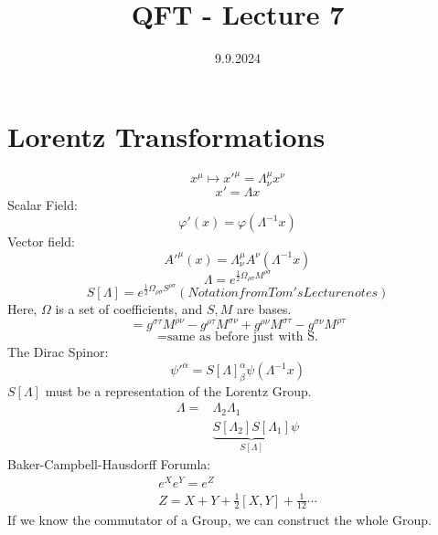 \documentclass[]{scrartcl}
\title{QFT - Lecture 7}
\author{}
\date{9.9.2024}
\begin{document}
\maketitle
\newpage
\tableofcontents
\newpage

\section{Lorentz Transformations} 

\begin{equation}
	x^\mu \mapsto x'^\mu = \Lambda^\mu_\nu x^\nu
\end{equation}
\begin{equation}
	x' = \Lambda x
\end{equation}
Scalar Field:
\begin{equation}
	\varphi'(x) = \varphi(\Lambda^{-1}x)
\end{equation}
Vector field:
\begin{equation}
	A'^\mu(x) = \Lambda^\mu_\nu A^\nu(\Lambda^{-1}x)
\end{equation}
\begin{equation}
	\Lambda = e^{\frac{1}{2}\Omega_{\rho\sigma}M^{\rho\sigma}}
\end{equation}
\begin{equation}
	S[\Lambda] = e^{\frac{1}{2}\Omega_{\rho\sigma}S^{\rho\sigma}} (Notation from Tom's Lecture notes)
\end{equation}
Here, $\Omega$ is a set of coefficients, and $S, M$ are bases.
\begin{equation}
	[M^{\rho\sigma}M^{\tau\nu}] = g^{\sigma\tau}M^{\rho\nu} - g^{\rho\tau}M^{\sigma\nu} + g^{\rho\nu}M^{\sigma\tau} - g^{\sigma\nu}M^{\rho\tau} 
\end{equation}
\begin{equation}
	[S^{\rho\sigma}, S^{\tau\nu}] = \text{same as before just with S.}
\end{equation}
The Dirac Spinor:
\begin{equation}
	\psi'^\alpha = S[\Lambda]^\alpha_\beta \psi(\Lambda^{-1}x)
\end{equation}
$S[\Lambda]$ must be a representation of the Lorentz Group.
\begin{align}
	\Lambda = &\Lambda_2 \Lambda_1\\
		  &\underbrace{S[\Lambda_2]S[\Lambda_1]}_{S[\Lambda]}\psi
\end{align}
Baker-Campbell-Hausdorff Forumla:
\begin{gather}
	e^X e^Y = e^Z\\
	Z = X + Y + \frac{1}{2}[X,Y] + \frac{1}{12}\cdots
\end{gather}
If we know the commutator of a Group, we can construct the whole Group.
\end{document}
